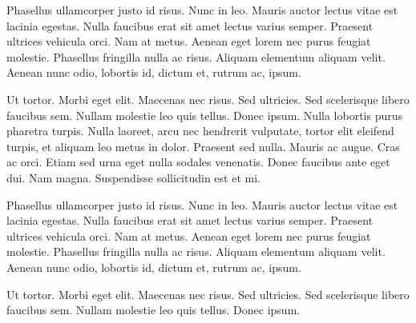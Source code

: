 Phasellus ullamcorper justo id risus. Nunc in leo. Mauris auctor
lectus vitae est lacinia egestas. Nulla faucibus erat sit amet lectus
varius semper. Praesent ultrices vehicula orci. Nam at metus. Aenean
eget lorem nec purus feugiat molestie. Phasellus fringilla nulla ac
risus. Aliquam elementum aliquam velit. Aenean nunc odio, lobortis id,
dictum et, rutrum ac, ipsum. 

Ut tortor. Morbi eget elit. Maecenas nec risus. Sed ultricies. Sed
scelerisque libero faucibus sem. Nullam molestie leo quis
tellus. Donec ipsum. Nulla lobortis purus pharetra turpis. Nulla
laoreet, arcu nec hendrerit vulputate, tortor elit eleifend turpis, et
aliquam leo metus in dolor. Praesent sed nulla. Mauris ac augue. Cras
ac orci. Etiam sed urna eget nulla sodales venenatis. Donec faucibus
ante eget dui. Nam magna. Suspendisse sollicitudin est et mi. 

Phasellus ullamcorper justo id risus. Nunc in leo. Mauris auctor
lectus vitae est lacinia egestas. Nulla faucibus erat sit amet lectus
varius semper. Praesent ultrices vehicula orci. Nam at metus. Aenean
eget lorem nec purus feugiat molestie. Phasellus fringilla nulla ac
risus. Aliquam elementum aliquam velit. Aenean nunc odio, lobortis id,
dictum et, rutrum ac, ipsum. 

Ut tortor. Morbi eget elit. Maecenas nec risus. Sed ultricies. Sed
scelerisque libero faucibus sem. Nullam molestie leo quis
tellus. Donec ipsum. 
